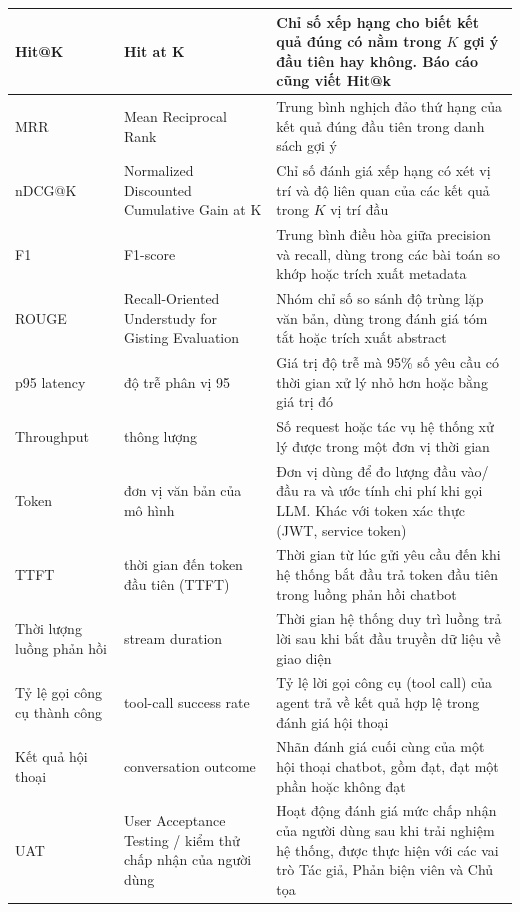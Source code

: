 \begin{longtable}{|C{0.16\textwidth}|P{0.22\textwidth}|P{0.55\textwidth}|}
  Hit@K      &      Hit at K      &      Chỉ số xếp hạng cho biết kết quả đúng có nằm trong $K$ gợi ý đầu tiên hay không. Báo cáo cũng viết Hit@k \\ \hline
  MRR     &     Mean Reciprocal Rank     &     Trung bình nghịch đảo thứ hạng của kết quả đúng đầu tiên trong danh sách gợi ý \\ \hline
  nDCG@K      &      Normalized Discounted Cumulative Gain at K      &      Chỉ số đánh giá xếp hạng có xét vị trí và độ liên quan của các kết quả trong $K$ vị trí đầu \\ \hline
  F1     &     F1-score     &     Trung bình điều hòa giữa precision và recall, dùng trong các bài toán so khớp hoặc trích xuất metadata \\ \hline
  ROUGE      &      Recall-\allowbreak Oriented Understudy for Gisting Evaluation      &      Nhóm chỉ số so sánh độ trùng lặp văn bản, dùng trong đánh giá tóm tắt hoặc trích xuất abstract \\ \hline
  p95 latency     &     độ trễ phân vị 95     &     Giá trị độ trễ mà 95\% số yêu cầu có thời gian xử lý nhỏ hơn hoặc bằng giá trị đó \\ \hline
  Throughput      &      thông lượng      &      Số request hoặc tác vụ hệ thống xử lý được trong một đơn vị thời gian \\ \hline
  Token     &     đơn vị văn bản của mô hình     &     Đơn vị dùng để đo lượng đầu vào/đầu ra và ước tính chi phí khi gọi LLM. Khác với token xác thực (JWT, service token) \\ \hline
  TTFT      &      thời gian đến token đầu tiên (TTFT)      &      Thời gian từ lúc gửi yêu cầu đến khi hệ thống bắt đầu trả token đầu tiên trong luồng phản hồi chatbot \\ \hline
  Thời lượng luồng phản hồi     &     stream duration     &     Thời gian hệ thống duy trì luồng trả lời sau khi bắt đầu truyền dữ liệu về giao diện \\ \hline
  Tỷ lệ gọi công cụ thành công      &      tool-\allowbreak call success rate      &      Tỷ lệ lời gọi công cụ (tool call) của agent trả về kết quả hợp lệ trong đánh giá hội thoại \\ \hline
  Kết quả hội thoại     &     conversation outcome     &     Nhãn đánh giá cuối cùng của một hội thoại chatbot, gồm đạt, đạt một phần hoặc không đạt \\ \hline
  UAT     &     User Acceptance Testing / kiểm thử chấp nhận của người dùng     &     Hoạt động đánh giá mức chấp nhận của người dùng sau khi trải nghiệm hệ thống, được thực hiện với các vai trò Tác giả, Phản biện viên và Chủ tọa \\ \hline
\end{longtable}
\endgroup

